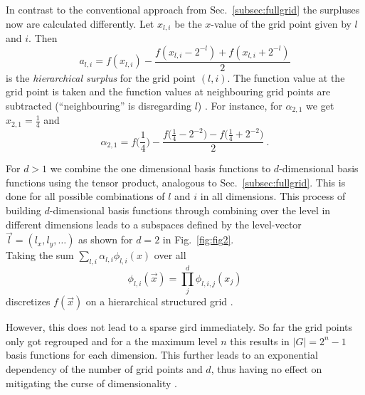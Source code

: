 In contrast to the conventional approach from
Sec.~\ref{subsec:fullgrid} the surpluses now are calculated
differently.
Let $x_{l,i}$ be the $x$-value of the grid point given by $l$ and $i$. Then
$$a_{l,i} = f(x_{l,i}) - \frac{f(x_{l,i} - 2^{-l}) + f(x_{l,i} + 2^{-l})}{2}$$
is the \emph{hierarchical surplus} for the grid point $(l,i)$. The function
value at the grid point is taken and the function values
at neighbouring grid points are subtracted (``neighbouring''
is disregarding $l$) \cite{artbunlong}. 
For instance, for $\alpha_{2,1}$ we get $x_{2,1} =
\frac{1}{4}$ and
$$\alpha_{2,1} = f\Big(\frac{1}{4}\Big) - \frac{f\Big(\frac{1}{4} - 2^{-2}\Big) - f\Big(\frac{1}{4} + 2^{-2}\Big)}{2} \ .$$
\par
For $d > 1$ we combine the one dimensional basis functions
to $d$-dimensional basis functions using the tensor product,
analogous to Sec.~\ref{subsec:fullgrid}. This is done for all possible combinations
of $l$ and $i$ in all dimensions.
This process of building $d$-dimensional basis functions
through combining over the level in different dimensions leads to a
subspaces defined by the level-vector $\vec{l} = (l_x, l_y, \dots)$
as shown for $d = 2$ in Fig.~\ref{fig:fig2}. \\
Taking the sum $\sum_{l,i} \alpha_{l,i}\phi_{l,i}(x)$ over all
$$\phi_{l,i}(\vec{x}) = \prod_j^d{\phi_{l,i,j}(x_j)}$$
discretizes $f(\vec{x})$ on a hierarchical structured grid \cite{disspfl}.
\par
However, this does not lead to a sparse gird immediately. So far the
grid points only got regrouped and for a the maximum level $n$ this
results in $|G| = 2^{n} - 1$ basis functions for each dimension.
This further leads to an exponential dependency of the number of grid points
and $d$, thus having no effect on mitigating the curse of dimensionality
\cite{disspfl}.




